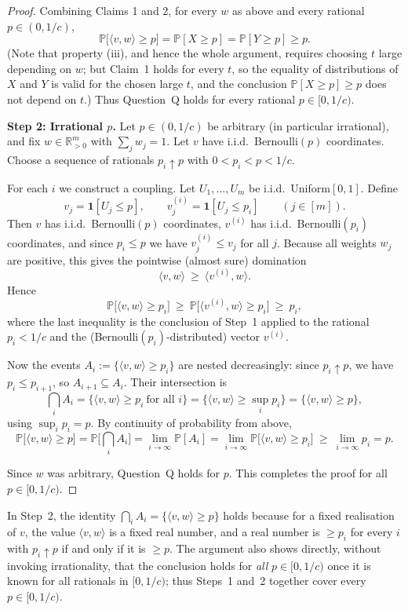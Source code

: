 \begin{proof}
Combining Claims 1 and 2, for every $w$ as above and every rational $p\in(0,1/c)$,
\[
\mathbb P\big[\langle v,w\rangle\ge p\big]=\mathbb P[X\ge p]=\mathbb P[Y\ge p]\ge p.
\]
(Note that property (iii), and hence the whole argument, requires choosing $t$ large depending on $w$; but Claim~1 holds for every $t$, so the equality of distributions of $X$ and $Y$ is valid for the chosen large $t$, and the conclusion $\mathbb P[X\ge p]\ge p$ does not depend on $t$.) Thus Question~Q holds for every rational $p\in[0,1/c)$.

\medskip
\noindent\textbf{Step 2: Irrational $p$.}
Let $p\in(0,1/c)$ be arbitrary (in particular irrational), and fix $w\in\mathbb{R}_{>0}^m$ with $\sum_j w_j=1$. Let $v$ have i.i.d.\ Bernoulli$(p)$ coordinates. Choose a sequence of rationals $p_i\uparrow p$ with $0<p_i<p<1/c$.

For each $i$ we construct a coupling. Let $U_1,\dots,U_m$ be i.i.d.\ Uniform$[0,1]$. Define
\[
v_j=\mathbf 1[U_j\le p],\qquad v_j^{(i)}=\mathbf 1[U_j\le p_i]\qquad(j\in[m]).
\]
Then $v$ has i.i.d.\ Bernoulli$(p)$ coordinates, $v^{(i)}$ has i.i.d.\ Bernoulli$(p_i)$ coordinates, and since $p_i\le p$ we have $v_j^{(i)}\le v_j$ for all $j$. Because all weights $w_j$ are positive, this gives the pointwise (almost sure) domination
\[
\langle v,w\rangle\ \ge\ \langle v^{(i)},w\rangle.
\]
Hence
\[
\mathbb P\big[\langle v,w\rangle\ge p_i\big]\ \ge\ \mathbb P\big[\langle v^{(i)},w\rangle\ge p_i\big]\ \ge\ p_i,
\]
where the last inequality is the conclusion of Step~1 applied to the rational $p_i<1/c$ and the (Bernoulli$(p_i)$-distributed) vector $v^{(i)}$.

Now the events $A_i:=\{\langle v,w\rangle\ge p_i\}$ are nested decreasingly: since $p_i\uparrow p$, we have $p_i\le p_{i+1}$, so $A_{i+1}\subseteq A_i$. Their intersection is
\[
\bigcap_{i} A_i=\Big\{\langle v,w\rangle\ge p_i\ \text{for all }i\Big\}=\big\{\langle v,w\rangle\ge \sup_i p_i\big\}=\big\{\langle v,w\rangle\ge p\big\},
\]
using $\sup_i p_i=p$. By continuity of probability from above,
\[
\mathbb P\big[\langle v,w\rangle\ge p\big]=\mathbb P\Big[\bigcap_i A_i\Big]=\lim_{i\to\infty}\mathbb P[A_i]=\lim_{i\to\infty}\mathbb P\big[\langle v,w\rangle\ge p_i\big]\ \ge\ \lim_{i\to\infty}p_i=p.
\]

Since $w$ was arbitrary, Question~Q holds for $p$. This completes the proof for all $p\in[0,1/c)$.
\end{proof}

\begin{remark}
In Step~2, the identity $\bigcap_i A_i=\{\langle v,w\rangle\ge p\}$ holds because for a fixed realisation of $v$, the value $\langle v,w\rangle$ is a fixed real number, and a real number is $\ge p_i$ for every $i$ with $p_i\uparrow p$ if and only if it is $\ge p$. The argument also shows directly, without invoking irrationality, that the conclusion holds for \emph{all} $p\in[0,1/c)$ once it is known for all rationals in $[0,1/c)$; thus Steps~1 and~2 together cover every $p\in[0,1/c)$.
\end{remark}

